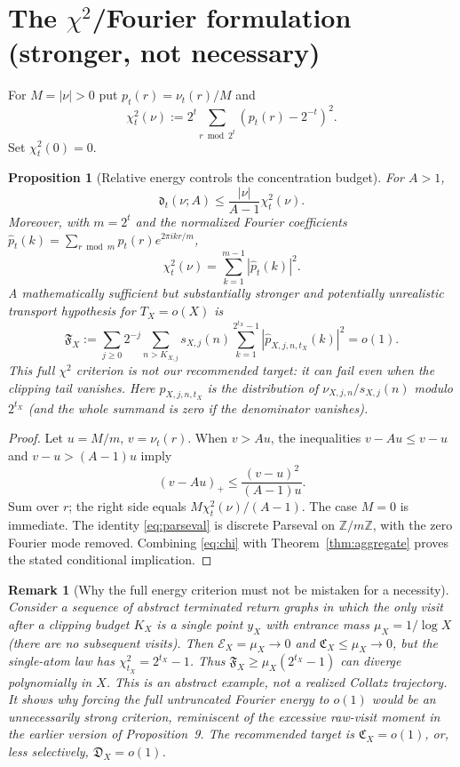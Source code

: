 \documentclass[11pt,a4paper]{article}
\newtheorem{proposition}[theorem]{Proposition}
\newtheorem{remark}[theorem]{Remark}
\begin{document}
\section{The $\chi^2$/Fourier formulation (stronger, not necessary)}
For $M=|\nu|>0$ put $p_t(r)=\nu_t(r)/M$ and
\[
 \chi_t^2(\nu):=2^t\sum_{r\bmod2^t}\left(p_t(r)-2^{-t}\right)^2.
\]
Set $\chi_t^2(0)=0$.
\begin{proposition}[Relative energy controls the concentration budget]\label{prop:energy}
For $A>1$,
\begin{equation}\label{eq:chi}
 \boxed{\quad \mathfrak d_t(\nu;A)\le\frac{|\nu|}{A-1}\chi_t^2(\nu).\quad}
\end{equation}
Moreover, with $m=2^t$ and the normalized Fourier coefficients
$\widehat p_t(k)=\sum_{r\bmod m}p_t(r)e^{2\pi i k r/m}$,
\begin{equation}\label{eq:parseval}
 \boxed{\quad\chi_t^2(\nu)=\sum_{k=1}^{m-1}|\widehat p_t(k)|^2.\quad}
\end{equation}
A mathematically sufficient but substantially \emph{stronger and potentially unrealistic} transport hypothesis for $T_X=o(X)$ is
\begin{equation}\label{eq:fourier-goal}
 \boxed{\quad
 \mathfrak F_X:=\sum_{j\ge0}2^{-j}\sum_{n>K_{X,j}}s_{X,j}(n)
 \sum_{k=1}^{2^{t_X}-1}
 \left|\widehat p_{X,j,n,t_X}(k)\right|^2=o(1).\quad}
\end{equation}
This full $\chi^2$ criterion is not our recommended target: it can fail even when the clipping tail vanishes. Here $p_{X,j,n,t_X}$ is the distribution of $\nu_{X,j,n}/s_{X,j}(n)$ modulo $2^{t_X}$ (and the whole summand is zero if the denominator vanishes).
\end{proposition}
\begin{proof}
Let $u=M/m$, $v=\nu_t(r)$. When $v>Au$, the inequalities $v-Au\le v-u$ and $v-u>(A-1)u$ imply
\[
 (v-Au)_+\le\frac{(v-u)^2}{(A-1)u}.
\]
Sum over $r$; the right side equals $M\chi_t^2(\nu)/(A-1)$. The case $M=0$ is immediate. The identity \eqref{eq:parseval} is discrete Parseval on $\mathbb Z/m\mathbb Z$, with the zero Fourier mode removed. Combining \eqref{eq:chi} with Theorem~\ref{thm:aggregate} proves the stated conditional implication.
\end{proof}

\begin{remark}[Why the full energy criterion must not be mistaken for a necessity]
Consider a sequence of abstract terminated return graphs in which the only visit after a clipping budget $K_X$ is a single point $y_X$ with entrance mass $\mu_X=1/\log X$ (there are no subsequent visits). Then $\mathcal E_X=\mu_X\to0$ and $\mathfrak C_X\le\mu_X\to0$, but the single-atom law has $\chi^2_{t_X}=2^{t_X}-1$. Thus $\mathfrak F_X\ge\mu_X(2^{t_X}-1)$ can diverge polynomially in $X$. This is an abstract example, not a realized Collatz trajectory. It shows why forcing the full untruncated Fourier energy to $o(1)$ would be an unnecessarily strong criterion, reminiscent of the excessive raw-visit moment in the earlier version of Proposition~9. The recommended target is $\mathfrak C_X=o(1)$, or, less selectively, $\mathfrak D_X=o(1)$.
\end{remark}
\end{document}
